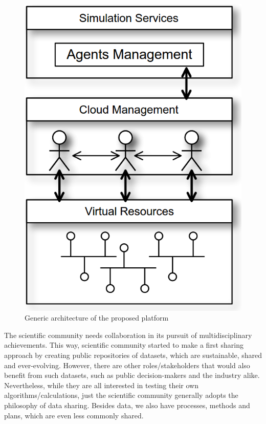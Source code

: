 \documentclass[conference]{IEEEtran}
\begin{document}
\begin{figure}[h!]
\centering
\includegraphics[height=.25\textheight]{general_arch.png}
\caption{Generic architecture of the proposed platform}
\label{fig:general_arch}
\vspace{-0.9em}
\end{figure}
 


The scientific community needs collaboration in its pursuit of multidisciplinary achievements. This way, scientific community started to make a first sharing approach by creating public repositories of datasets, which are sustainable, shared and ever-evolving. However, there are other roles/stakeholders that would also benefit from such datasets, such as public decision-makers and the industry alike. Nevertheless, while they are all interested in testing their own algorithms/calculations, just the scientific community generally adopts the philosophy of data sharing. Besides data, we also have processes, methods and plans, which are even less commonly shared.
\end{document}
